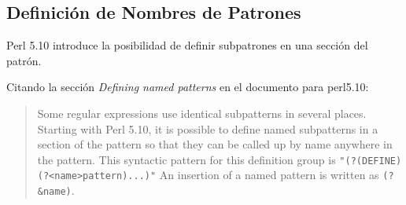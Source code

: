 \begin{exercise}
\begin{itemize}
\begin{verbatim}
\end{verbatim}
\end{itemize}
\end{exercise}

\subsection{Definición de Nombres de Patrones}
Perl 5.10 introduce la posibilidad de definir 
subpatrones en una sección del patrón. 


Citando la sección {\it Defining named patterns}
en el documento  para
perl5.10:

\begin{it}
\begin{quotation}
Some regular expressions use identical subpatterns in several
places. Starting with Perl 5.10, it is possible to define named
subpatterns in a section of the pattern so that they can be called up by
name anywhere in the pattern. 
This syntactic pattern for this definition group is
\verb|"(?(DEFINE)(?<name>pattern)...)"|  
An
insertion of a named pattern is written as \verb"(?&name)".
\end{quotation}
\end{it}

